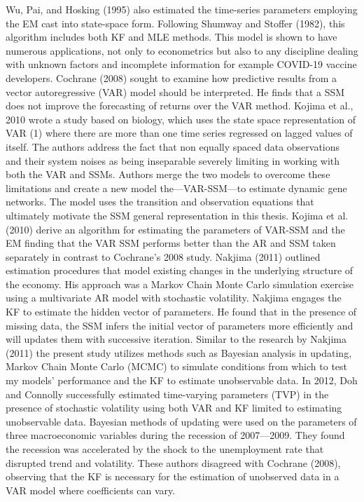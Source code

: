 \documentclass[12pt, letterpaper]{article}
\begin{document}
Wu, Pai, and Hosking (1995) also estimated the time-series parameters  employing the EM cast into state-space form. Following Shumway and Stoffer (1982), this algorithm includes both KF and MLE methods. This model is shown to have numerous applications, not only to econometrics but also to any discipline dealing with unknown factors and incomplete information for example COVID-19 vaccine developers. 
Cochrane (2008) sought to examine how predictive results from a vector autoregressive (VAR) model should be interpreted. He finds that a SSM does not improve the forecasting of returns over the VAR method. 
Kojima et al., 2010 wrote a study based on biology, which uses the state space representation of VAR (1) where there are more than one time series regressed on lagged values of itself. The authors address the fact that non equally spaced data observations and their system noises as being inseparable severely limiting in working with both the VAR and SSMs. Authors merge the two models to overcome these limitations and create a new model the—VAR-SSM—to estimate dynamic gene networks. The model uses the transition and observation equations that ultimately motivate the SSM general representation in this thesis. Kojima et al. (2010) derive an algorithm for estimating the parameters of VAR-SSM and the EM finding that the VAR SSM performs better than the AR and SSM taken separately in contrast to Cochrane’s 2008 study. 
Nakjima (2011) outlined estimation procedures that model existing changes in the underlying structure of the economy. His approach was a Markov Chain Monte Carlo simulation exercise using a multivariate AR model with stochastic volatility. Nakjima engages the KF to estimate the hidden vector of parameters. He found that in the presence of missing data, the SSM infers the initial vector of parameters more efficiently and will updates them with successive iteration. Similar to the research by Nakjima (2011) the present study utilizes methods such as Bayesian analysis in updating, Markov Chain Monte Carlo (MCMC) to simulate conditions from which to test my models’ performance and the KF to estimate unobservable data. 
In 2012, Doh and Connolly successfully estimated time-varying parameters (TVP) in the presence of stochastic volatility using both VAR and KF limited to estimating unobservable data. Bayesian methods of updating were used on the parameters of three macroeconomic variables during the recession of 2007—2009. They found the recession was accelerated by the shock to the unemployment rate that disrupted trend and volatility. These authors disagreed with Cochrane (2008), observing that the KF is necessary for the estimation of unobserved data in a VAR model where coefficients can vary. 
\end{document}
